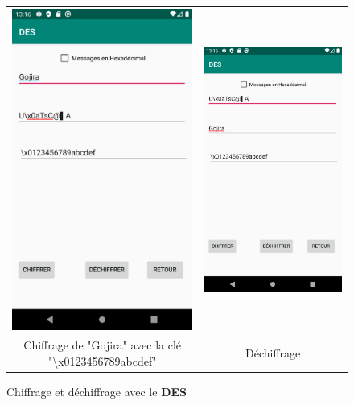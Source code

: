 \documentclass{article}
\begin{document}
\begin{figure}[b!]
    \centering
    \begin{tabular}{cc}
      \includegraphics[width=.35\linewidth]{./img/des_e.png} &
      \includegraphics[width=.35\linewidth]{./img/des_d.png} \\
      Chiffrage de "Gojira" avec la clé "\textbackslash x0123456789abcdef" & Déchiffrage \\
    \end{tabular}
    \caption{Chiffrage et déchiffrage avec le \textbf{DES}}\label{fig:des}
\end{figure}
\end{document}
